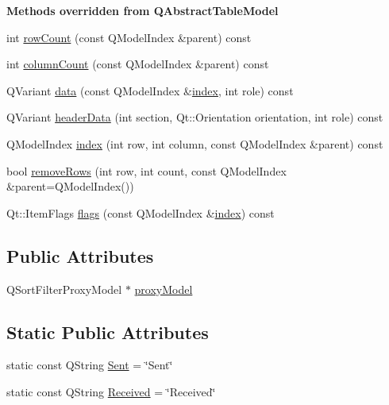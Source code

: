 \begin{Indent}{\bf Methods overridden from Q\+Abstract\+Table\+Model}\par
\begin{DoxyCompactItemize}
\item 
int \hyperlink{class_message_model_a3a48dbe500910f5c9afca70e7e968ad2}{row\+Count} (const Q\+Model\+Index \&parent) const 
\item 
int \hyperlink{class_message_model_a9c9f80216f2f14f0647e42f9cd9e7d0d}{column\+Count} (const Q\+Model\+Index \&parent) const 
\item 
Q\+Variant \hyperlink{class_message_model_af124db796fce9dab2c5d92625b9affb4}{data} (const Q\+Model\+Index \&\hyperlink{class_message_model_aad9e6963e446cf236c0a71ccd0e9f21c}{index}, int role) const 
\item 
Q\+Variant \hyperlink{class_message_model_adaffb10641c1117c5034621f4aa7b2aa}{header\+Data} (int section, Qt\+::\+Orientation orientation, int role) const 
\item 
Q\+Model\+Index \hyperlink{class_message_model_aad9e6963e446cf236c0a71ccd0e9f21c}{index} (int row, int column, const Q\+Model\+Index \&parent) const 
\item 
bool \hyperlink{class_message_model_a0bf2ae180e0d137be51b1e1567e66eee}{remove\+Rows} (int row, int count, const Q\+Model\+Index \&parent=Q\+Model\+Index())
\item 
Qt\+::\+Item\+Flags \hyperlink{class_message_model_afe81099417dbc6283025cce4f6a8748a}{flags} (const Q\+Model\+Index \&\hyperlink{class_message_model_aad9e6963e446cf236c0a71ccd0e9f21c}{index}) const 
\end{DoxyCompactItemize}
\end{Indent}
\subsection*{Public Attributes}
\begin{DoxyCompactItemize}
\item 
Q\+Sort\+Filter\+Proxy\+Model $\ast$ \hyperlink{class_message_model_a8248581c9ad7c1f00c4918f4b8b82404}{proxy\+Model}
\end{DoxyCompactItemize}
\subsection*{Static Public Attributes}
\begin{DoxyCompactItemize}
\item 
static const Q\+String \hyperlink{class_message_model_ae5014d3052e4cec590f673d22edb9cd0}{Sent} = \char`\"{}Sent\char`\"{}
\item 
static const Q\+String \hyperlink{class_message_model_a8539de55f3325f8237617fb50d7f632c}{Received} = \char`\"{}Received\char`\"{}
\end{DoxyCompactItemize}
